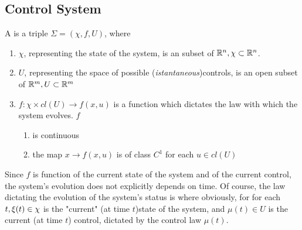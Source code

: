 \subsection{Control System} A  is a triple $\Sigma=(\chi,f,U) $, where 
\begin{enumerate}
	\item $\chi$, representing the state of the system, is an  subset of $\mathbb{R}^n, \chi\subset\mathbb{R}^n$.
	\item $U$, representing the space of possible (\textit{istantaneous})controls, is an open subset of $\mathbb{R}^m,U\subset\mathbb{R}^m$
	\item $f: \chi \times cl(U) \rightarrow f(x,u)$ is a function which dictates the law with which the system evolves. $f$
	\begin{enumerate}
		\item is continuous
		\item the map $x \rightarrow f(x,u)$ is of class $C^1$ for each $u \in cl(U)$
	\end{enumerate}
\end{enumerate}

Since $f$ is function of the current state of the system and of the current control, the system's evolution does not explicitly depends on time. Of course, the law dictating the evolution of the system's status is 
where obviously, for for each $t,\xi (t)\in\chi$ is the "current" (at time $t$)state of the system, and $\mu(t)\in U$ is the current (at time $t$) control, dictated by the control law $\mu(t)$.


